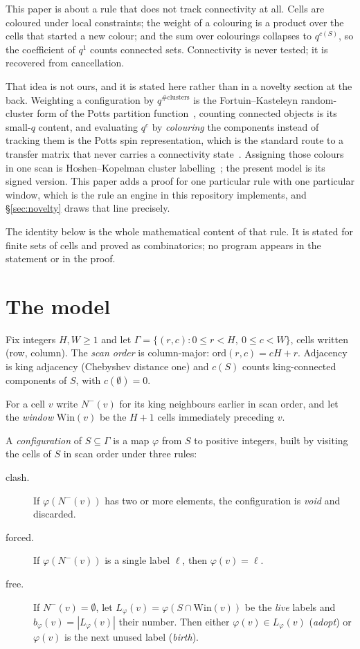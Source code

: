\documentclass[11pt]{article}
\newcommand{\Win}{\mathrm{Win}}
\begin{document}
This paper is about a rule that does not track connectivity at all. Cells are
coloured under local constraints; the weight of a colouring is a product over
the cells that started a new colour; and the sum over colourings collapses to
$q^{c(S)}$, so the coefficient of $q^1$ counts connected sets. Connectivity is
never tested; it is recovered from cancellation.

That idea is not ours, and it is stated here rather than in a novelty section at
the back. Weighting a configuration by $q^{\#\text{clusters}}$ is the
Fortuin--Kasteleyn random-cluster form of the Potts partition
function~\cite{fortuinKasteleyn1972}, counting connected objects is its
small-$q$ content, and evaluating $q^{c}$ by \emph{colouring} the components
instead of tracking them is the Potts spin representation, which is the standard
route to a transfer matrix that never carries a connectivity
state~\cite{bloteNightingale1982}. Assigning those colours in one scan is
Hoshen--Kopelman cluster labelling~\cite{hoshenKopelman1976}; the present model
is its signed version. This paper adds a proof for one particular rule with
one particular window, which is the rule an engine in this repository
implements, and \S\ref{sec:novelty} draws that line precisely.

The identity below is the whole mathematical content of that rule. It is stated
for finite sets of cells and proved as combinatorics; no program appears in the
statement or in the proof.

\section{The model}
\label{sec:model}

Fix integers $H, W \ge 1$ and let $\Gamma = \{(r,c) : 0 \le r < H,\ 0 \le c < W\}$,
cells written (row, column). The \emph{scan order} is column-major:
$\mathrm{ord}(r,c) = cH + r$. Adjacency is king adjacency (Chebyshev distance
one) and $c(S)$ counts king-connected components of $S$, with $c(\emptyset) = 0$.

For a cell $v$ write $N^-(v)$ for its king neighbours earlier in scan order, and
let the \emph{window} $\Win(v)$ be the $H+1$ cells immediately preceding $v$.

A \emph{configuration} of $S \subseteq \Gamma$ is a map $\varphi$ from $S$ to
positive integers, built by visiting the cells of $S$ in scan order under three
rules:

\begin{description}
\item[clash.] If $\varphi(N^-(v))$ has two or more elements, the configuration is
  \emph{void} and discarded.
\item[forced.] If $\varphi(N^-(v))$ is a single label $\ell$, then
  $\varphi(v) = \ell$.
\item[free.] If $N^-(v) = \emptyset$, let
  $L_\varphi(v) = \varphi(S \cap \Win(v))$ be the \emph{live} labels and
  $b_\varphi(v) = |L_\varphi(v)|$ their number. Then either
  $\varphi(v) \in L_\varphi(v)$ (\emph{adopt}) or $\varphi(v)$ is the next unused
  label (\emph{birth}).
\end{description}
\end{document}
